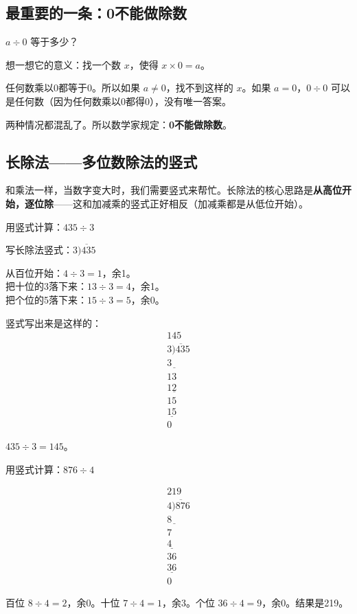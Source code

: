 \subsection*{最重要的一条：0不能做除数}

$a\div0$ 等于多少？

想一想它的意义：找一个数 $x$，使得 $x\times0=a$。

任何数乘以0都等于0。所以如果 $a\neq0$，找不到这样的 $x$。如果 $a=0$，$0\div0$ 可以是任何数（因为任何数乘以0都得0），没有唯一答案。

两种情况都混乱了。所以数学家规定：\textbf{0不能做除数}。

\subsection*{长除法——多位数除法的竖式}

和乘法一样，当数字变大时，我们需要竖式来帮忙。长除法的核心思路是\textbf{从高位开始，逐位除}——这和加减乘的竖式正好相反（加减乘都是从低位开始）。

\begin{example}
用竖式计算：$435\div3$
\end{example}
\begin{solution}
写长除法竖式：$3\overline{)435}$

从百位开始：$4\div3 = 1$，余1。\\
把十位的3落下来：$13\div3 = 4$，余1。\\
把个位的5落下来：$15\div3 = 5$，余0。

竖式写出来是这样的：
\[
\begin{array}{r}
  145 \\
3\overline{)435} \\
  \underline{3\phantom{00}} \\
  13\phantom{0} \\
  \underline{12\phantom{0}} \\
  15 \\
  \underline{15} \\
   0
\end{array}
\]

$435\div3 = 145$。
\end{solution}

\begin{example}
用竖式计算：$876\div4$
\end{example}
\begin{solution}
\[
\begin{array}{r}
  219 \\
4\overline{)876} \\
  \underline{8\phantom{00}} \\
   7\phantom{0} \\
  \underline{4\phantom{0}} \\
  36 \\
  \underline{36} \\
   0
\end{array}
\]

百位 $8\div4=2$，余0。十位 $7\div4=1$，余3。个位 $36\div4=9$，余0。结果是219。
\end{solution}

